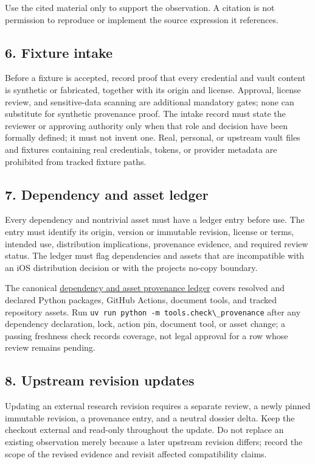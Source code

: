 \documentclass[
  letterpaper,
]{article}
\newcommand{\passthrough}[1]{#1}
\begin{document}
Use the cited material only to support the observation. A citation is not permission to reproduce or implement the
source expression it references.

\subsection{6. Fixture intake}\label{6-fixture-intake}

Before a fixture is accepted, record proof that every credential and vault content is synthetic or fabricated, together
with its origin and license. Approval, license review, and sensitive-data scanning are additional mandatory gates; none
can substitute for synthetic provenance proof. The intake record must state the reviewer or approving authority only
when that role and decision have been formally defined; it must not invent one. Real, personal, or upstream vault files
and fixtures containing real credentials, tokens, or provider metadata are prohibited from tracked fixture paths.

\subsection{7. Dependency and asset ledger}\label{7-dependency-and-asset-ledger}

Every dependency and nontrivial asset must have a ledger entry before use. The entry must identify its origin, version
or immutable revision, license or terms, intended use, distribution implications, provenance evidence, and required
review status. The ledger must flag dependencies and assets that are incompatible with an iOS distribution decision or
with the project\textquotesingle s no-copy boundary.

The canonical \href{dependency-asset-provenance-ledger.md}{dependency and asset provenance ledger} covers resolved and
declared Python packages, GitHub Actions, document tools, and tracked repository assets. Run
\passthrough{\lstinline!uv run python -m tools.check\_provenance!} after any dependency declaration, lock, action pin,
document tool, or asset change; a passing freshness check records coverage, not legal approval for a row whose review
remains pending.

\subsection{8. Upstream revision updates}\label{8-upstream-revision-updates}

Updating an external research revision requires a separate review, a newly pinned immutable revision, a provenance
entry, and a neutral dossier delta. Keep the checkout external and read-only throughout the update. Do not replace an
existing observation merely because a later upstream revision differs; record the scope of the revised evidence and
revisit affected compatibility claims.
\end{document}
